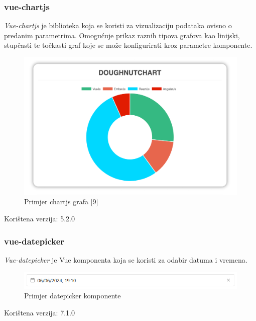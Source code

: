\documentclass[zavrsnirad]{fer}
\begin{document}
\subsubsection{vue-chartjs}
\label{pog:chart.vue}
\textit{Vue-chartjs} je biblioteka koja se koristi za vizualizaciju podataka ovisno o predanim parametrima. Omogućuje prikaz raznih tipova grafova kao linijski, stupčasti te točkasti graf koje se može konfigurirati kroz parametre komponente.
\begin{figure}[htb]
	\centering
	\includegraphics[width=0.9\linewidth]{images/chartjs_example.png} 
	\caption{Primjer chartjs grafa [9]}
	\label{slk:chartjs_example}
\end{figure}
\FloatBarrier

Korištena verzija: 5.2.0

\subsubsection{vue-datepicker}
\textit{Vue-datepicker} je Vue komponenta koja se koristi za odabir datuma i vremena.
\begin{figure}[htb]
	\centering
	\includegraphics[width=1\linewidth]{images/datepicker_example.png} 
	\caption{Primjer datepicker komponente}
	\label{slk:datepicker_example}
\end{figure}
\FloatBarrier

Korištena verzija: 7.1.0
\end{document}
